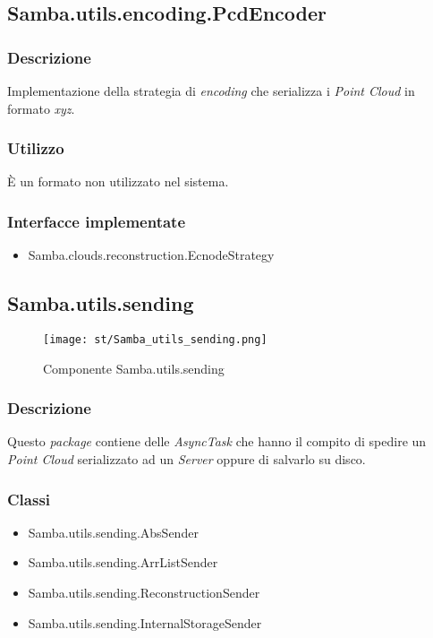 \subsection{Samba.utils.encoding.PcdEncoder}
\subsubsection{Descrizione}
Implementazione della strategia di \emph{encoding} che serializza i \emph{Point Cloud} in formato \emph{xyz}.
\subsubsection{Utilizzo}
È un formato non utilizzato nel sistema.
\subsubsection{Interfacce implementate}
\begin{itemize}
	\item Samba.clouds.reconstruction.EcnodeStrategy
\end{itemize}


\subsection{Samba.utils.sending}
\begin{figure}[!h] 
    \centering 
    \texttt{[image: st/Samba\_utils\_sending.png]} 
    \caption{Componente Samba.utils.sending}
\end{figure}
\subsubsection{Descrizione}
Questo \emph{package} contiene delle \emph{AsyncTask} che hanno il compito di spedire un \emph{Point Cloud} serializzato ad un \emph{Server} oppure di salvarlo su disco.
\subsubsection{Classi}
\begin{itemize}
	\item Samba.utils.sending.AbsSender
	\item Samba.utils.sending.ArrListSender
	\item Samba.utils.sending.ReconstructionSender
	\item Samba.utils.sending.InternalStorageSender
\end{itemize}

